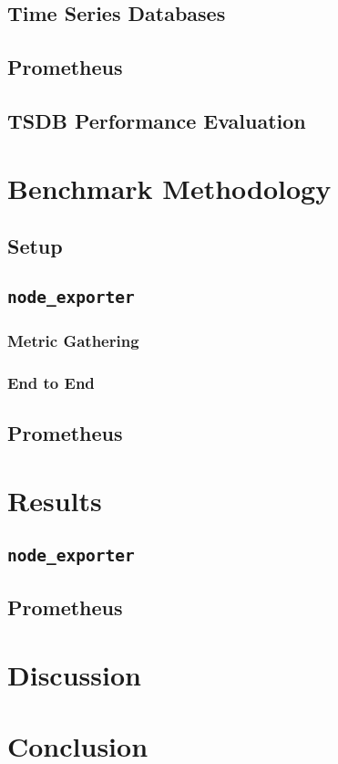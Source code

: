 \subsection{Time Series Databases}
\subsection{Prometheus}
\subsection{TSDB Performance Evaluation}

\section{Benchmark Methodology}
\subsection{Setup}
\subsection{\texttt{node\_exporter}}
\subsubsection{Metric Gathering}
\subsubsection{End to End}
\subsection{Prometheus}

\section{Results}
\subsection{\texttt{node\_exporter}}
\subsection{Prometheus}

\section{Discussion}

\section{Conclusion}
